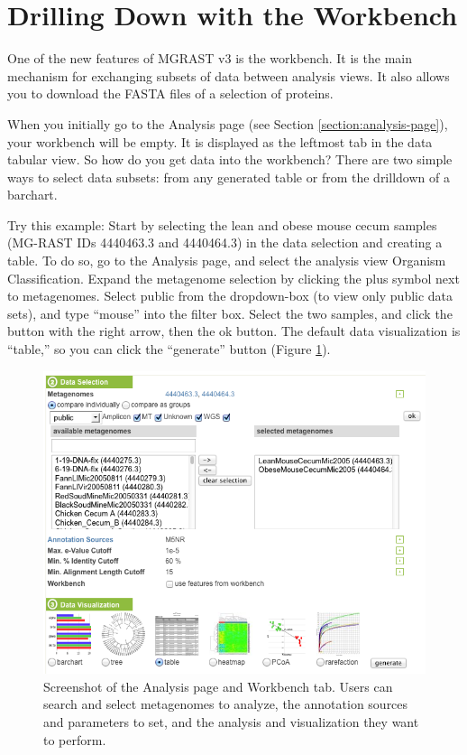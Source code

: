 \documentclass[12pt,fullpage]{report}
\begin{document}
\section{Drilling Down with the Workbench}

One of the new features of MGRAST v3 is the workbench. It is the main mechanism for exchanging subsets of data between analysis views. It also allows you to download the FASTA files of a selection of proteins.

When you initially go to the Analysis page (see Section \ref{section:analysis-page}), your workbench will be empty. It is displayed as the leftmost tab in the data tabular view. So how do you get data into the workbench? There are two simple ways to select data subsets: from any generated table or from the drilldown of a barchart.

Try this example: Start by selecting the lean and obese mouse cecum samples (MG-RAST IDs 4440463.3 and 4440464.3) \cite{OBESEMICE} in the data selection and creating a table. To do so, go to the Analysis page, and select the analysis view Organism Classification. Expand the metagenome selection by clicking the plus symbol next to metagenomes. Select public from the dropdown-box (to view only public data sets), and type ``mouse'' into the filter box. Select the two samples, and click the button with the right arrow, then the ok button. The default data visualization is ``table,'' so you can click the ``generate'' button (Figure \ref{fig:analysis-page-selecting-lean-and-obese}).

\begin{figure}
\begin{center}
\includegraphics[width=6in]{Images/analysis-page-selecting-lean-and-obese.png}
\end{center}
\caption{
Screenshot of the Analysis page and Workbench tab. Users can search and select metagenomes to analyze, the annotation sources and parameters to set, and the analysis and visualization they want to perform.
}
\label{fig:analysis-page-selecting-lean-and-obese}
\end{figure}
\end{document}
